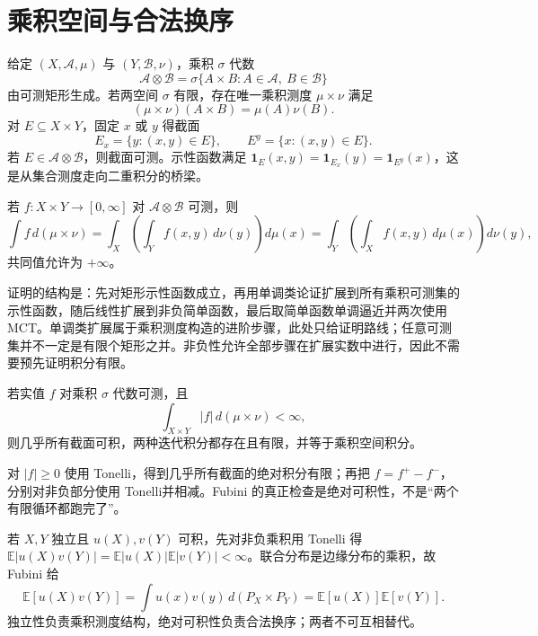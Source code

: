 \section{乘积空间与合法换序}

给定 $(X,\mathcal A,\mu)$ 与 $(Y,\mathcal B,\nu)$，乘积 $\sigma$ 代数
\[
 \mathcal A\otimes\mathcal B
 =\sigma\{A\times B:A\in\mathcal A,\ B\in\mathcal B\}
\]
由可测矩形生成。若两空间 $\sigma$ 有限，存在唯一乘积测度 $\mu\times\nu$ 满足
\[
 (\mu\times\nu)(A\times B)=\mu(A)\nu(B).
\]
对 $E\subseteq X\times Y$，固定 $x$ 或 $y$ 得截面
\[
 E_x=\{y:(x,y)\in E\},\qquad E^y=\{x:(x,y)\in E\}.
\]
若 $E\in\mathcal A\otimes\mathcal B$，则截面可测。示性函数满足 $\mathbf1_E(x,y)=\mathbf1_{E_x}(y)=\mathbf1_{E^y}(x)$，这是从集合测度走向二重积分的桥梁。


\begin{theorem}[Tonelli]
若 $f:X\times Y\to[0,\infty]$ 对 $\mathcal A\otimes\mathcal B$ 可测，则
\[
 \int f\,d(\mu\times\nu)
 =\int_X\!\left(\int_Y f(x,y)\,d\nu(y)\right)d\mu(x)
 =\int_Y\!\left(\int_X f(x,y)\,d\mu(x)\right)d\nu(y),
\]
共同值允许为 $+\infty$。
\end{theorem}

证明的结构是：先对矩形示性函数成立，再用单调类论证扩展到所有乘积可测集的示性函数，随后线性扩展到非负简单函数，最后取简单函数单调逼近并两次使用 MCT。单调类扩展属于乘积测度构造的进阶步骤，此处只给证明路线；任意可测集并不一定是有限个矩形之并。非负性允许全部步骤在扩展实数中进行，因此不需要预先证明积分有限。

\begin{theorem}[Fubini]
若实值 $f$ 对乘积 $\sigma$ 代数可测，且
\[
 \int_{X\times Y}|f|\,d(\mu\times\nu)<\infty,
\]
则几乎所有截面可积，两种迭代积分都存在且有限，并等于乘积空间积分。
\end{theorem}

对 $|f|\geq0$ 使用 Tonelli，得到几乎所有截面的绝对积分有限；再把 $f=f^+-f^-$，分别对非负部分使用 Tonelli并相减。Fubini 的真正检查是绝对可积性，不是“两个有限循环都跑完了”。

\begin{example}[独立时的期望乘积]
若 $X,Y$ 独立且 $u(X),v(Y)$ 可积，先对非负乘积用 Tonelli 得 $\mathbb E|u(X)v(Y)|=\mathbb E|u(X)|\mathbb E|v(Y)|<\infty$。联合分布是边缘分布的乘积，故 Fubini 给
\[
 \mathbb E[u(X)v(Y)]
 =\int u(x)v(y)\,d(P_X\times P_Y)
 =\mathbb E[u(X)]\mathbb E[v(Y)].
\]
独立性负责乘积测度结构，绝对可积性负责合法换序；两者不可互相替代。
\end{example}

